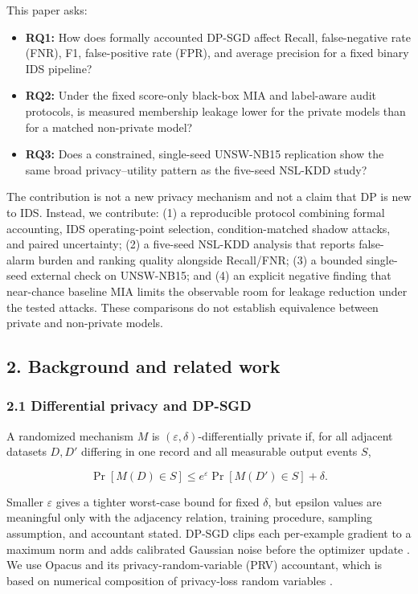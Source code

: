\documentclass[11pt,a4paper]{article}
\providecommand{\tightlist}{\setlength{\itemsep}{0pt}\setlength{\parskip}{0pt}}
\begin{document}
This paper asks:

\begin{itemize}
\tightlist
\item
  \textbf{RQ1:} How does formally accounted DP-SGD affect Recall,
  false-negative rate (FNR), F1, false-positive rate (FPR), and average
  precision for a fixed binary IDS pipeline?
\item
  \textbf{RQ2:} Under the fixed score-only black-box MIA and label-aware
  audit protocols, is measured membership leakage lower for the private
  models than for a matched non-private model?
\item
  \textbf{RQ3:} Does a constrained, single-seed UNSW-NB15 replication
  show the same broad privacy--utility pattern as the five-seed NSL-KDD
  study?
\end{itemize}

The contribution is not a new privacy mechanism and not a claim that DP
is new to IDS. Instead, we contribute: (1) a reproducible protocol
combining formal accounting, IDS operating-point selection,
condition-matched shadow attacks, and paired uncertainty; (2) a
five-seed NSL-KDD analysis that reports false-alarm burden and ranking
quality alongside Recall/FNR; (3) a bounded single-seed external check
on UNSW-NB15; and (4) an explicit negative finding that near-chance
baseline MIA limits the observable room for leakage reduction under the
tested attacks. These comparisons do not establish equivalence between
private and non-private models.

\hypertarget{background-and-related-work}{%
\subsection{2. Background and related
work}\label{background-and-related-work}}

\hypertarget{differential-privacy-and-dp-sgd}{%
\subsubsection{2.1 Differential privacy and
DP-SGD}\label{differential-privacy-and-dp-sgd}}

A randomized mechanism \(M\) is \((\varepsilon,\delta)\)-differentially
private if, for all adjacent datasets \(D,D'\) differing in one record
and all measurable output events \(S\),

\[
\Pr[M(D)\in S] \leq e^{\varepsilon}\Pr[M(D')\in S]+\delta.
\]

Smaller \(\varepsilon\) gives a tighter worst-case bound for fixed
\(\delta\), but epsilon values are meaningful only with the adjacency
relation, training procedure, sampling assumption, and accountant
stated. DP-SGD clips each per-example gradient to a maximum norm and
adds calibrated Gaussian noise before the optimizer update
\citep{abadi2016deep}. We use Opacus \citep{yousefpour2021opacus} and
its privacy-random-variable (PRV) accountant, which is based on
numerical composition of privacy-loss random variables
\citep{gopi2021numerical}.
\end{document}
